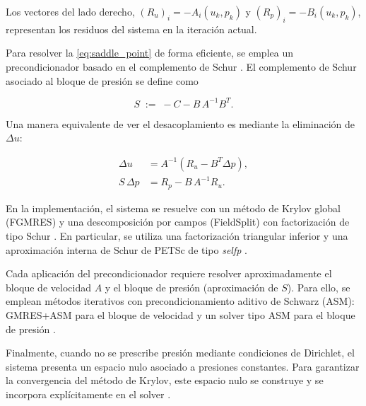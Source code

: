 \documentclass[12pt, letterpaper]{article}
\begin{document}
Los vectores del lado derecho, $(R_u)_i = -A_i(u_k, p_k)$ y $(R_p)_i = -B_i(u_k, p_k)$, representan los residuos del sistema en la iteración actual. 

Para resolver la \cref{eq:saddle_point} de forma eficiente, se emplea un precondicionador basado en el complemento de Schur \cite{iterative_solvers}. El complemento de Schur asociado al bloque de presión se define como

\begin{equation}
  \label{eq:schur_exact}
  S \;:=\; -C - B\,A^{-1}B^T.
\end{equation}

Una manera equivalente de ver el desacoplamiento es mediante la eliminación de $\Delta u$:

\begin{align}
  \label{eq:schur_reduction_u}
  \Delta u &= A^{-1}\left(R_u - B^T\Delta p\right),\\
  \label{eq:schur_reduction_p}
  S\,\Delta p &= R_p - B\,A^{-1}R_u.
\end{align}

En la implementación, el sistema se resuelve con un método de Krylov global (FGMRES) \cite{fgmres} y una descomposición por campos (FieldSplit) con factorización de tipo Schur \cite{iterative_solvers}. En particular, se utiliza una factorización triangular inferior y una aproximación interna de Schur de PETSc de tipo \textit{selfp} \cite{precond}.

Cada aplicación del precondicionador requiere resolver aproximadamente el bloque de velocidad $A$ y el bloque de presión (aproximación de $S$). Para ello, se emplean métodos iterativos con precondicionamiento aditivo de Schwarz (ASM): GMRES+ASM para el bloque de velocidad y un solver tipo ASM para el bloque de presión \cite{parallel_solve}.

Finalmente, cuando no se prescribe presión mediante condiciones de Dirichlet, el sistema presenta un espacio nulo asociado a presiones constantes. Para garantizar la convergencia del método de Krylov, este espacio nulo se construye y se incorpora explícitamente en el solver \cite{iterative_solvers}.

\end{document}
